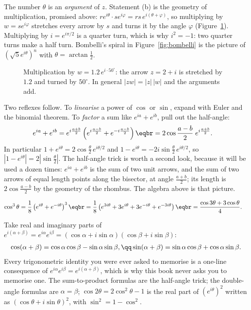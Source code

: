 The number $\theta$ is an \emph{argument} of $z$. Statement (b) is the geometry of multiplication, promised above: $re^{i\theta}\cdot se^{i\varphi}=rs\,e^{i(\theta+\varphi)}$,
so multiplying by $w=se^{i\varphi}$ stretches every arrow by $s$ and turns it by the angle $\varphi$ (Figure~\ref{fig:multiply}). Multiplying by $i=e^{i\pi/2}$ is a
quarter turn, which is why $i^2=-1$: two quarter turns make a half turn. Bombelli's spiral in Figure~\ref{fig:bombelli} is the picture of $(\sqrt5e^{i\theta})^n$
with $\theta=\arctan\frac12$.

\begin{figure}[ht]
\centering
{}
\caption{Multiplication by $w=1.2\,e^{i\cdot50^\circ}$: the arrow $z=2+i$ is stretched by $1.2$ and turned by $50^\circ$. In general $|zw|=|z|\,|w|$ and the arguments add.}
\label{fig:multiply}
\end{figure}

Two reflexes follow. To \emph{linearise} a power of $\cos$ or $\sin$, expand with Euler and the binomial theorem.
To \emph{factor} a sum like $e^{ia}+e^{ib}$, pull out the half-angle:
\[
\begin{aligned}e^{ia}+e^{ib}&=e^{i\frac{a+b}2}\left(e^{i\frac{a-b}2}+e^{-i\frac{a-b}2}\right)\eqbr=2\cos\frac{a-b}2\;e^{i\frac{a+b}2}.\end{aligned}
\]
In particular $1+e^{i\theta}=2\cos\frac\theta2\,e^{i\theta/2}$ and $1-e^{i\theta}=-2i\sin\frac\theta2\,e^{i\theta/2}$,
so $|1-e^{i\theta}|=2\left|\sin\frac\theta2\right|$. The half-angle trick is worth a second look, because it will be used a dozen times: $e^{ia}+e^{ib}$ is
the sum of two unit arrows, and the sum of two arrows of equal length points along the bisector, at angle $\frac{a+b}2$; its length is $2\cos\frac{a-b}2$ by
the geometry of the rhombus. The algebra above is that picture.

\begin{example}
\[\begin{aligned}\cos^3\theta&=\frac18\left(e^{i\theta}+e^{-i\theta}\right)^3\eqbr=\frac18\left(e^{3i\theta}+3e^{i\theta}+3e^{-i\theta}+e^{-3i\theta}\right)
\eqbr=\frac{\cos3\theta+3\cos\theta}4.\end{aligned}\]
\end{example}

\begin{examplex}
Take real and imaginary parts of $e^{i(\alpha+\beta)}=e^{i\alpha}e^{i\beta}=(\cos\alpha+i\sin\alpha)(\cos\beta+i\sin\beta)$:
\[
\begin{gathered}\cos(\alpha+\beta)=\cos\alpha\cos\beta-\sin\alpha\sin\beta,\qq\sin(\alpha+\beta)=\sin\alpha\cos\beta+\cos\alpha\sin\beta.\end{gathered}
\]
Every trigonometric identity you were ever asked to memorise is a one-line consequence of $e^{i\alpha}e^{i\beta}=e^{i(\alpha+\beta)}$, which is why this book
never asks you to memorise one. The sum-to-product formulas are the half-angle trick; the double-angle formulas are $\alpha=\beta$; $\cos2\theta=2\cos^2\theta-1$
is the real part of $(e^{i\theta})^2$ written as $(\cos\theta+i\sin\theta)^2$, with $\sin^2=1-\cos^2$.
\end{examplex}

